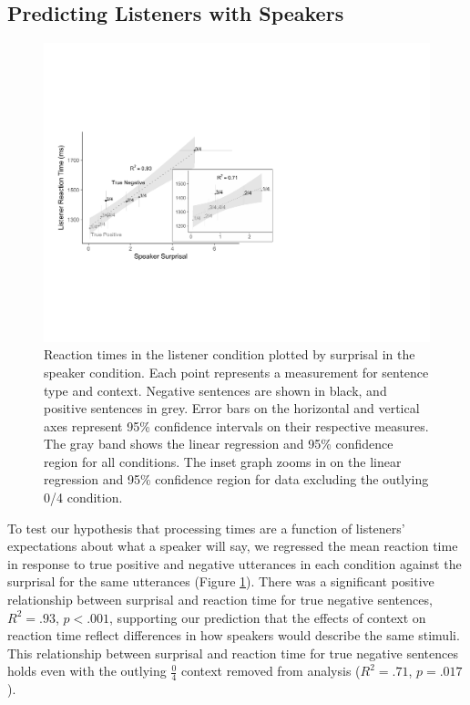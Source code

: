 \documentclass[man, floatsintext, noapacite]{apa6}
\begin{document}
\subsection{Predicting Listeners with Speakers}

\begin{figure}[t]
\begin{center} 
\includegraphics[width=6in]{figures/surprisal_rt_v3.pdf}
\caption{\label{fig:scatter} Reaction times in the listener condition plotted by surprisal in the speaker condition. Each point represents a measurement for sentence type and context. Negative sentences are shown in black, and positive sentences in grey. Error bars on the horizontal and vertical axes represent 95\% confidence intervals on their respective measures. The gray band shows the linear regression and  95\% confidence region for all conditions. The inset graph zooms in on the linear regression and 95\% confidence region for data excluding the outlying 0/4 condition.}
\end{center} 
\end{figure}

To test our hypothesis that processing times are a function of listeners' expectations about what a speaker will say, we regressed the mean reaction time in response to true positive and negative utterances in each condition against the surprisal for the same utterances (Figure \ref{fig:scatter}).  There was a significant positive relationship between surprisal and reaction time for true negative sentences, $R^2=.93$, $p<.001$, supporting our prediction that the effects of context on reaction time reflect differences in how speakers would describe the same stimuli. This relationship between surprisal and reaction time for true negative sentences holds even with the outlying $\frac{0}{4}$ context removed from analysis ($R^2=.71$, $p = .017$).
\end{document}
